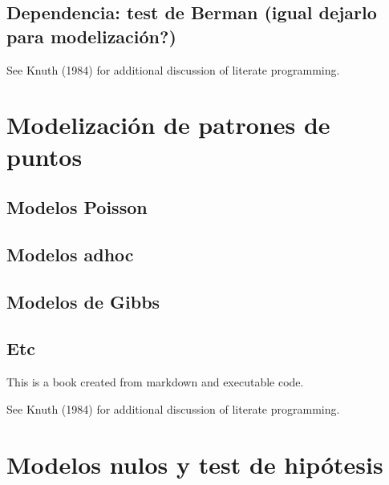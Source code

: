 \documentclass[
  letterpaper,
  DIV=11,
  numbers=noendperiod]{scrreprt}
\begin{document}
\hypertarget{dependencia-test-de-berman-igual-dejarlo-para-modelizaciuxf3n}{%
\section{Dependencia: test de Berman (igual dejarlo para
modelización?)}\label{dependencia-test-de-berman-igual-dejarlo-para-modelizaciuxf3n}}

See Knuth (1984) for additional discussion of literate programming.


\hypertarget{modelizaciuxf3n-de-patrones-de-puntos}{%
\chapter{Modelización de patrones de
puntos}\label{modelizaciuxf3n-de-patrones-de-puntos}}

\hypertarget{modelos-poisson}{%
\section{Modelos Poisson}\label{modelos-poisson}}

\hypertarget{modelos-adhoc}{%
\section{Modelos adhoc}\label{modelos-adhoc}}

\hypertarget{modelos-de-gibbs}{%
\section{Modelos de Gibbs}\label{modelos-de-gibbs}}

\hypertarget{etc}{%
\section{Etc}\label{etc}}

This is a book created from markdown and executable code.

See Knuth (1984) for additional discussion of literate programming.


\hypertarget{modelos-nulos-y-test-de-hipuxf3tesis}{%
\chapter{Modelos nulos y test de
hipótesis}\label{modelos-nulos-y-test-de-hipuxf3tesis}}
\end{document}

